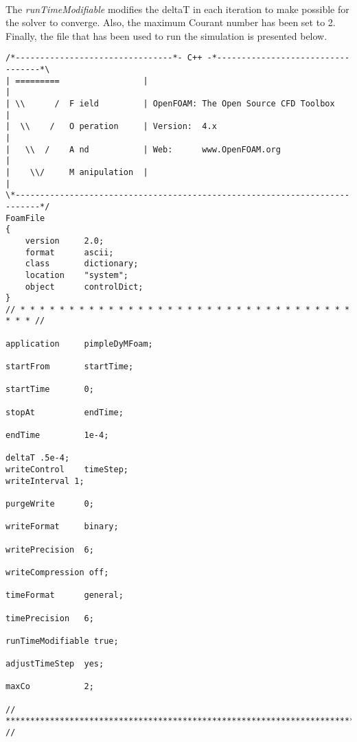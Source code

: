 \paragraph{}The \textit{runTimeModifiable} modifies the deltaT in each iteration to make possible for the solver to converge. Also, the maximum Courant number has been set to 2. Finally, the file that has been used to run the simulation is presented below.

\begin{footnotesize}
\begin{verbatim}
/*--------------------------------*- C++ -*----------------------------------*\
| =========                 |                                                 |
| \\      /  F ield         | OpenFOAM: The Open Source CFD Toolbox           |
|  \\    /   O peration     | Version:  4.x                                   |
|   \\  /    A nd           | Web:      www.OpenFOAM.org                      |
|    \\/     M anipulation  |                                                 |
\*---------------------------------------------------------------------------*/
FoamFile
{
    version     2.0;
    format      ascii;
    class       dictionary;
    location    "system";
    object      controlDict;
}
// * * * * * * * * * * * * * * * * * * * * * * * * * * * * * * * * * * * * * //

application     pimpleDyMFoam;

startFrom       startTime;

startTime       0;

stopAt          endTime;

endTime         1e-4;

deltaT .5e-4;
writeControl    timeStep;
writeInterval 1;

purgeWrite      0;

writeFormat     binary;

writePrecision  6;

writeCompression off;

timeFormat      general;

timePrecision   6;

runTimeModifiable true;

adjustTimeStep  yes;

maxCo           2;

// ************************************************************************* //
\end{verbatim}
\end{footnotesize}
